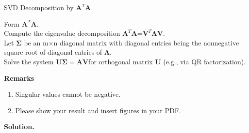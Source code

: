 \documentclass[english,onecolumn]{IEEEtran}
\begin{document}
\begin{algorithm}[htbp]
\caption{SVD Decomposition by $\mathbf{A}^T\mathbf{A}$}
\label{alg:svd}
\SetAlgoLined
{}
Form $\mathbf{A}^T\mathbf{A}$.\\
Compute the eigenvalue decomposition $\mathbf{A}^T\mathbf{A}$=$\mathbf{V}^T\mathbf{\Lambda V}$.\\
Let $\mathbf{\Sigma}$ be an m$\times$n diagonal matrix with diagonal entries being the nonnegative square root of diagonal entries of $\mathbf{\Lambda}$.\\
Solve the system $\mathbf{U\Sigma} = \mathbf{AV} $for orthogonal matrix $\mathbf{U}$ (e.g., via QR factorization). \\

\end{algorithm}
{\bf Remarks}
\begin{enumerate}
    \item Singular values cannot be negative.
    \item Please show your result and insert figures in your PDF.
\end{enumerate}

\noindent
\textbf{Solution.}
\end{document}
